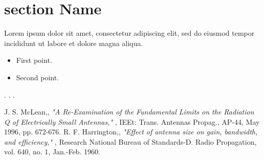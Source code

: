 \documentclass[12pt,a4paper]{report}
\begin{document}
\section{section Name}
Lorem ipsum dolor sit amet, consectetur adipiscing elit, sed do eiusmod tempor incididunt ut labore et dolore magna aliqua. \cite{HAR}

\begin{itemize}
\item First point.
\item Second point.
\end{itemize}


. . .
    \newpage
    \begin{thebibliography}{9}
     J. S. McLean,, \textit{"A Re-Examination of the Fundamental Limits on the Radiation Q of Electrically Small Antennas," }, IEEt: Trans. Antennas Propag., AP-44, May 1996, pp. 672-676.
R. F. Harrington,, \textit{"Effect of antenna size on gain, bandwidth, and efficiency,"  }, Research National Bureau of Standards-D. Radio Propagation, vol. 640, no. 1, Jan.-Feb. 1960.
    \end{thebibliography}

{}
\end{document}
